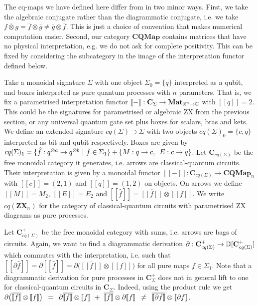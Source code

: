 \begin{remark}
The cq-maps we have defined here differ from \cite{CoeckeKissinger17} in two
minor ways. First, we take the algebraic conjugate rather than the diagrammatic
conjugate, i.e. we take $\overline{f \otimes g}
= \overline{f} \otimes \overline{g} \neq \overline{g} \otimes \overline{f}$.
This is just a choice of convention that makes numerical computation easier.
Second, our category $\mathbf{CQMap}$ contains matrices that have no physical
interpretation, e.g. we do not ask for complete positivity. This can be fixed
by considering the subcategory in the image of the interpretation functor
defined below.
\end{remark}

Take a monoidal signature $\Sigma$ with one object $\Sigma_0 = \{ q \}$
interpreted as a qubit, and boxes interpreted as pure quantum processes with
$n$ parameters. That is, we fix a parametrised interpretation functor $[\![-]\!]
: \mathbf{C}_\Sigma \to \mathbf{Mat}_{\mathbb{R}^n \to \mathbb{C}}$ with $[\![q]\!] = 2$.
This could be the signatures for parametrised or algebraic ZX
from the previous section, or any universal quantum gate set plus boxes
for scalars, bras and kets.
We define an extended signature $cq(\Sigma) \supset \Sigma$ with two objects
$cq(\Sigma)_0 = \{ c, q \}$ interpreted as bit and qubit respectively.
Boxes are given by $cq(\Sigma)_1 =
\{ \hat{f} : q^{\otimes a} \to q^{\otimes b} \ \vert \ f \in \Sigma_1 \}
+ \{ M : q \to c, \enspace E : c \to q \}$.
Let $\mathbf{C}_{cq(\Sigma)}$ be the free monoidal category it generates,
i.e. arrows are classical-quantum circuits.
Their interpretation is given by a monoidal functor
$[\![-]\!] : \mathbf{C}_{cq(\Sigma)} \to \mathbf{CQMap}_n$ with
$[\![c]\!] = (2, 1)$ and $[\![q]\!] = (1, 2)$ on objects.
On arrows we define $[\![M]\!] = M_2$, $[\![E]\!] = E_2$ and
$[\![\hat{f}]\!] = \overline{[\![f]\!]} \otimes [\![f]\!]$.
We write $cq(\mathbf{ZX}_n)$ for the category of classical-quantum circuits
with parametrised ZX diagrams as pure processes.

Let $\mathbf{C}_{cq(\Sigma)}^+$ be the free monoidal category with sums,
i.e. arrows are bags of circuits.
Again, we want to find a diagrammatic derivation
$\partial : \mathbf{C}_{cq(\Sigma)}^+ \to \mathbb{D}[\mathbf{C}_{cq(\Sigma)}^+]$
which commutes with the interpretation, i.e. such that
$[\![\partial \hat{f}]\!] = \partial [\![\hat{f}]\!] =
\partial \big( \overline{[\![f]\!]} \otimes [\![f]\!] \big)$
for all pure maps $f \in \Sigma_1$.
Note that a diagrammatic derivation for pure processes in
$\mathbf{C}_{\Sigma}^+$ does not in general lift to one for classical-quantum
circuits in $\mathbf{C}_{\Sigma}$. Indeed, using the product rule we get
$\partial \big( \overline{[\![f]\!]} \otimes [\![f]\!] \big)
\s = \s \partial \overline{[\![f]\!]} \otimes [\![f]\!]
\ + \ \overline{[\![f]\!]} \otimes \partial [\![f]\!]
\s \neq \s \overline{[\![\partial f]\!]} \otimes [\![\partial f]\!]$.

